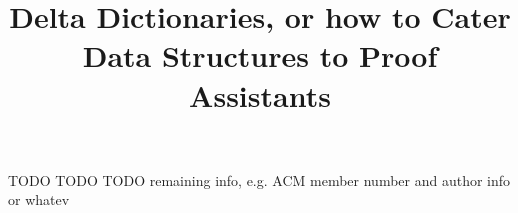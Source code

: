 \documentclass[nonacm]{acmart}
\theoremstyle{slplain}
\numberwithin{thm}{section}
\begin{document}
\title{Delta Dictionaries, or how to Cater Data Structures to Proof Assistants}




TODO TODO TODO remaining info, e.g. ACM member number and author info or whatev





\maketitle
\thispagestyle{empty} %
\end{document}
